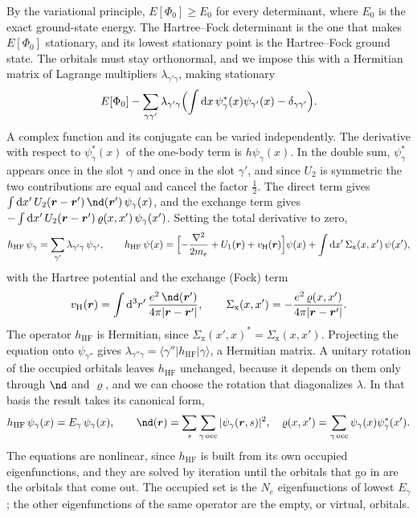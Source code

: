 By the variational principle, $E[\Phi_0] \ge E_0$ for every determinant, where $E_0$ is the exact ground-state energy. The Hartree--Fock determinant is the one that makes $E[\Phi_0]$ stationary, and its lowest stationary point is the Hartree--Fock ground state. The orbitals must stay orthonormal, and we impose this with a Hermitian matrix of Lagrange multipliers $\lambda_{\gamma'\gamma}$, making stationary
\begin{equation*}
  E[\Phi_0] - \sum_{\gamma\gamma'}\lambda_{\gamma'\gamma}\Bigl(\int\mathrm{d} x\,\psi^*_\gamma(x)\psi_{\gamma'}(x) - \delta_{\gamma\gamma'}\Bigr) .
\end{equation*}
A complex function and its conjugate can be varied independently. The derivative with respect to $\psi^*_\gamma(x)$ of the one-body term is $h\psi_\gamma(x)$. In the double sum, $\psi^*_\gamma$ appears once in the slot $\gamma$ and once in the slot $\gamma'$, and since $U_2$ is symmetric the two contributions are equal and cancel the factor $\tfrac12$. The direct term gives $\int\dd x'\,U_2(\vect{r} - \vect{r}')\,\nd(\vect{r}')\,\psi_\gamma(x)$, and the exchange term gives $-\int\mathrm{d} x'\,U_2(\bm{r} - \bm{r}')\,\varrho(x, x')\,\psi_\gamma(x')$. Setting the total derivative to zero,
\begin{equation*}
  h_{\mathrm{HF}}\,\psi_\gamma = \sum_{\gamma'}\lambda_{\gamma'\gamma}\,\psi_{\gamma'} , \qquad
  h_{\mathrm{HF}}\,\psi(x) = \Bigl[-\frac{\nabla^2}{2m_e} + U_1(\bm{r}) + v_{\mathrm{H}}(\bm{r})\Bigr]\psi(x) + \int\mathrm{d} x'\,\Sigma_{\mathrm{x}}(x, x')\,\psi(x') ,
\end{equation*}
with the Hartree potential and the exchange (Fock) term
\begin{equation*}
  v_{\mathrm{H}}(\vect{r}) = \int\dd^3r'\,\frac{e^2\,\nd(\vect{r}')}{4\pi|\vect{r} - \vect{r}'|}, \qquad
  \Sigma_{\mathrm{x}}(x, x') = -\frac{e^2\,\varrho(x, x')}{4\pi|\vect{r} - \vect{r}'|} .
\end{equation*}
The operator $h_{\mathrm{HF}}$ is Hermitian, since $\Sigma_{\mathrm{x}}(x', x)^* = \Sigma_{\mathrm{x}}(x, x')$. Projecting the equation onto $\psi_{\gamma''}$ gives $\lambda_{\gamma''\gamma} = \langle\gamma''|h_{\mathrm{HF}}|\gamma\rangle$, a Hermitian matrix. A unitary rotation of the occupied orbitals leaves $h_{\mathrm{HF}}$ unchanged, because it depends on them only through $\nd$ and $\varrho$, and we can choose the rotation that diagonalizes $\lambda$. In that basis the result takes its canonical form,
\begin{equation}
  h_{\mathrm{HF}}\,\psi_\gamma(x) = E_\gamma\,\psi_\gamma(x), \qquad
  \nd(\vect{r}) = \sum_s\sum_{\gamma\,\mathrm{occ}}|\psi_\gamma(\vect{r}, s)|^2, \quad
  \varrho(x, x') = \sum_{\gamma\,\mathrm{occ}}\psi_\gamma(x)\psi^*_\gamma(x') .
  \label{eq:D.4-HF}
\end{equation}
The equations are nonlinear, since $h_{\mathrm{HF}}$ is built from its own occupied eigenfunctions, and they are solved by iteration until the orbitals that go in are the orbitals that come out. The occupied set is the $N_e$ eigenfunctions of lowest $E_\gamma$; the other eigenfunctions of the same operator are the empty, or virtual, orbitals.

